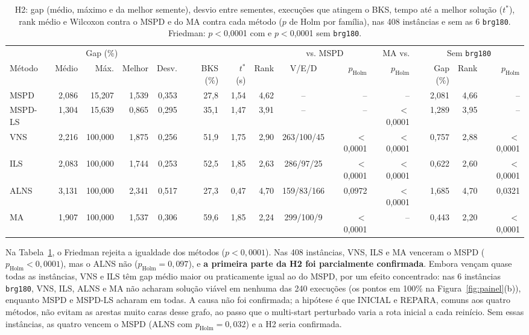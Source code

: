 \begin{table}[t]
\centering
\caption{H2: gap (médio, máximo e da melhor semente), desvio entre sementes, execuções que atingem o BKS, tempo até a melhor solução ($t^*$), rank médio e Wilcoxon contra o MSPD e do MA contra cada método ($p$ de Holm por família), nas 408 instâncias e sem as 6 \texttt{brg180}. Friedman: $p<$0,0001 com e $p<$0,0001 sem \texttt{brg180}.}
\label{tab:h2}
\scriptsize
\setlength{\tabcolsep}{2.6pt}
\begin{tabular}{lrrrrrrrcrr|rrr}
\toprule
 & \multicolumn{3}{c}{Gap (\%)} & & & & & \multicolumn{2}{c}{vs. MSPD} & MA vs. & \multicolumn{3}{c}{Sem \texttt{brg180}} \\
\cmidrule(lr){2-4}\cmidrule(lr){9-10}\cmidrule(lr){12-14}
Método & Médio & Máx. & Melhor & Desv. & BKS (\%) & $t^*$ (s) & Rank & V/E/D & $p_{\mathrm{Holm}}$ & $p_{\mathrm{Holm}}$ & Gap (\%) & Rank & $p_{\mathrm{Holm}}$ \\
\midrule
MSPD & 2,086 & 15,207 & 1,539 & 0,353 & 27,8 & 1,54 & 4,62 & -- & -- & -- & 2,081 & 4,66 & -- \\
MSPD-LS & 1,304 & 15,639 & 0,865 & 0,295 & 35,1 & 1,47 & 3,91 & -- & -- & $<$0,0001 & 1,289 & 3,95 & -- \\
VNS & 2,216 & 100,000 & 1,875 & 0,256 & 51,9 & 1,75 & 2,90 & 263/100/45 & $<$0,0001 & $<$0,0001 & 0,757 & 2,88 & $<$0,0001 \\
ILS & 2,083 & 100,000 & 1,744 & 0,253 & 52,5 & 1,85 & 2,63 & 286/97/25 & $<$0,0001 & $<$0,0001 & 0,622 & 2,60 & $<$0,0001 \\
ALNS & 3,131 & 100,000 & 2,341 & 0,517 & 27,3 & 0,47 & 4,70 & 159/83/166 & 0,0972 & $<$0,0001 & 1,685 & 4,70 & 0,0321 \\
MA & 1,907 & 100,000 & 1,537 & 0,306 & 59,6 & 1,85 & 2,24 & 299/100/9 & $<$0,0001 & -- & 0,443 & 2,20 & $<$0,0001 \\
\bottomrule
\end{tabular}
\end{table}

Na Tabela~\ref{tab:h2}, o Friedman rejeita a igualdade dos métodos ($p<0{,}0001$). Nas 408 instâncias, VNS, ILS e MA venceram o MSPD ($p_{\mathrm{Holm}}<0{,}0001$), mas o ALNS não ($p_{\mathrm{Holm}}=0{,}097$), e \textbf{a primeira parte da H2 foi parcialmente confirmada}. Embora vençam quase todas as instâncias, VNS e ILS têm gap médio maior ou praticamente igual ao do MSPD, por um efeito concentrado: nas 6 instâncias \texttt{brg180}, VNS, ILS, ALNS e MA não acharam solução viável em nenhuma das 240 execuções (os pontos em 100\% na Figura~\ref{fig:painel}(b)), enquanto MSPD e MSPD-LS acharam em todas. A causa não foi confirmada; a hipótese é que INICIAL e REPARA, comuns aos quatro métodos, não evitam as arestas muito caras desse grafo, ao passo que o multi-start perturbado varia a rota inicial a cada reinício. Sem essas instâncias, as quatro vencem o MSPD (ALNS com $p_{\mathrm{Holm}}=0{,}032$) e a H2 seria confirmada.

